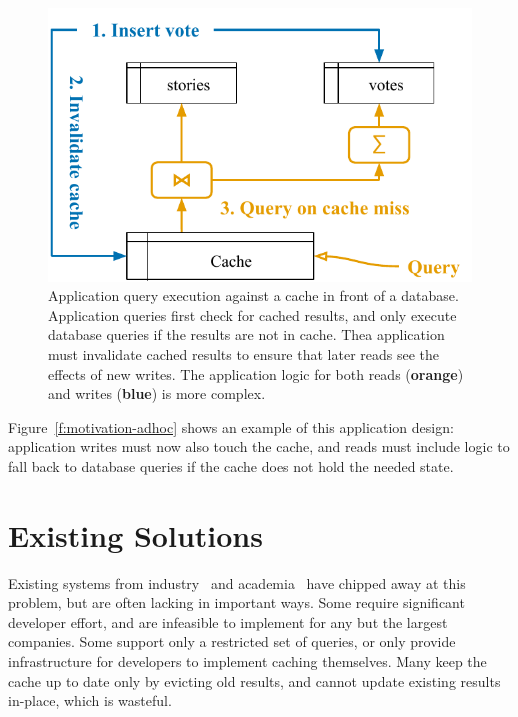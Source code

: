 \begin{figure}
  \centering
  \includegraphics{diagrams/Motivation Ad-Hoc Cache.pdf}
  \caption{Application query execution against a cache in front of a database.
  Application queries first check for cached results, and only execute database
  queries if the results are not in cache. Thea application must invalidate
  cached results to ensure that later reads see the effects of new writes. The
  application logic for both reads (\textbf{\color{set2}orange}) and writes
  (\textbf{\color{set1}blue}) is more complex.}
  \label{f:motivation-adhoc}
\end{figure}

Figure~\vref{f:motivation-adhoc} shows an example of this application design:
application writes must now also touch the cache, and reads must include logic
to fall back to database queries if the cache does not hold the needed state.

\section{Existing Solutions}

Existing systems from industry~\cite{facebook-memcache, tao, flannel} and
academia~\cite{txcache, cachegenie, casql-consistency-thesis, pequod} have
chipped away at this problem, but are often lacking in important ways. Some
require significant developer effort, and are infeasible to implement for any
but the largest companies. Some support only a restricted set of queries, or
only provide infrastructure for developers to implement caching themselves. Many
keep the cache up to date only by evicting old results, and cannot update
existing results in-place, which is wasteful.

